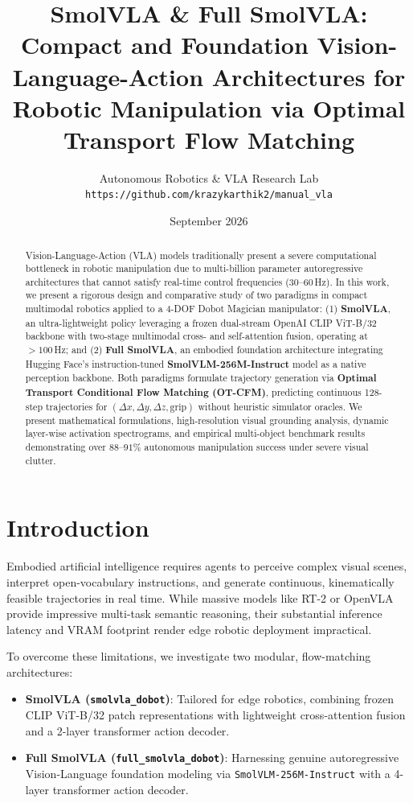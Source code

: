 \documentclass[10pt,twocolumn,letterpaper]{article}
\title{\textbf{SmolVLA \& Full SmolVLA: Compact and Foundation Vision-Language-Action Architectures for Robotic Manipulation via Optimal Transport Flow Matching}}
\author{
Autonomous Robotics \& VLA Research Lab\\
\texttt{https://github.com/krazykarthik2/manual\_vla}
}
\date{September 2026}
\begin{document}
\maketitle

\begin{abstract}
Vision-Language-Action (VLA) models traditionally present a severe computational bottleneck in robotic manipulation due to multi-billion parameter autoregressive architectures that cannot satisfy real-time control frequencies ($30\text{--}60\,$Hz). In this work, we present a rigorous design and comparative study of two paradigms in compact multimodal robotics applied to a 4-DOF Dobot Magician manipulator: (1) \textbf{SmolVLA}, an ultra-lightweight policy leveraging a frozen dual-stream OpenAI CLIP ViT-B/32 backbone with two-stage multimodal cross- and self-attention fusion, operating at $>100\,$Hz; and (2) \textbf{Full SmolVLA}, an embodied foundation architecture integrating Hugging Face's instruction-tuned \textbf{SmolVLM-256M-Instruct} model as a native perception backbone. Both paradigms formulate trajectory generation via \textbf{Optimal Transport Conditional Flow Matching (OT-CFM)}, predicting continuous 128-step trajectories for $(\Delta x, \Delta y, \Delta z, \text{grip})$ without heuristic simulator oracles. We present mathematical formulations, high-resolution visual grounding analysis, dynamic layer-wise activation spectrograms, and empirical multi-object benchmark results demonstrating over $88\text{--}91\%$ autonomous manipulation success under severe visual clutter.
\end{abstract}

\section{Introduction}
Embodied artificial intelligence requires agents to perceive complex visual scenes, interpret open-vocabulary instructions, and generate continuous, kinematically feasible trajectories in real time. While massive models like RT-2 or OpenVLA provide impressive multi-task semantic reasoning, their substantial inference latency and VRAM footprint render edge robotic deployment impractical.

To overcome these limitations, we investigate two modular, flow-matching architectures:
\begin{itemize}
    \item \textbf{SmolVLA (\texttt{smolvla\_dobot})}: Tailored for edge robotics, combining frozen CLIP ViT-B/32 patch representations with lightweight cross-attention fusion and a 2-layer transformer action decoder.
    \item \textbf{Full SmolVLA (\texttt{full\_smolvla\_dobot})}: Harnessing genuine autoregressive Vision-Language foundation modeling via \texttt{SmolVLM-256M-Instruct} with a 4-layer transformer action decoder.
\end{itemize}
\end{document}
